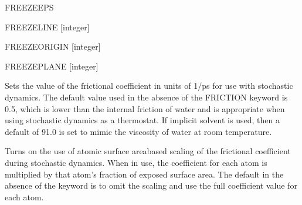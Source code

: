 \documentclass[letterpaper,11pt,english]{sphinxmanual}
\begin{document}
\ignorespaces {}\label{\detokenize{text/keywords:key-freeze-eps}}
\sphinxAtStartPar
FREEZE\sphinxhyphen{}EPS

\ignorespaces {}\label{\detokenize{text/keywords:key-freeze-line}}
\sphinxAtStartPar
FREEZE\sphinxhyphen{}LINE {[}integer{]}

\ignorespaces {}\label{\detokenize{text/keywords:key-freeze-origin}}
\sphinxAtStartPar
FREEZE\sphinxhyphen{}ORIGIN {[}integer{]}

\ignorespaces {}\label{\detokenize{text/keywords:key-freeze-plane}}
\sphinxAtStartPar
FREEZE\sphinxhyphen{}PLANE {[}integer{]}

\ignorespaces 
{}\ignorespaces {}\label{\detokenize{text/keywords:key-reactionfield}}\label{\detokenize{text/keywords:key-friction}}\begin{description}
\sphinxAtStartPar
Sets the value of the frictional coefficient in units of 1/ps for use with stochastic dynamics. The default value used in the absence of the FRICTION keyword is 0.5, which is lower than the internal friction of water and is appropriate when using stochastic dynamics as a thermostat. If implicit solvent is used, then a default of 91.0 is set to mimic the viscosity of water at room temperature.

\end{description}

\ignorespaces {}\label{\detokenize{text/keywords:key-friction-scaling}}\begin{description}
\sphinxAtStartPar
Turns on the use of atomic surface area\sphinxhyphen{}based scaling of the frictional coefficient during stochastic dynamics. When in use, the coefficient for each atom is multiplied by that atom’s fraction of exposed surface area. The default in the absence of the keyword is to omit the scaling and use the full coefficient value for each atom.

\end{description}
\end{document}
